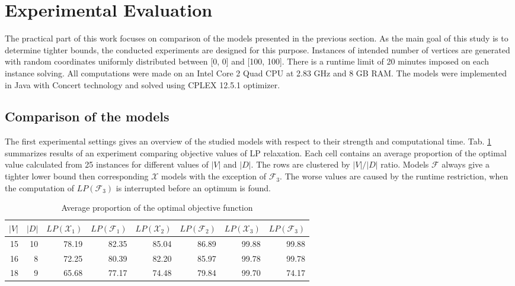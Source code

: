 \section{Experimental Evaluation}
\label{sec:exp}

The practical part of this work focuses on comparison of the models presented in the previous section.
As the main goal of this study is to determine tighter bounds, the conducted experiments are designed for this purpose.
Instances of intended number of vertices are generated with random coordinates uniformly distributed between [0, 0] and [100, 100].
There is a runtime limit of 20 minutes imposed on each instance solving.
All computations were made on an Intel Core 2 Quad CPU at 2.83 GHz and 8 GB RAM.
The models were implemented in Java with Concert technology and solved using CPLEX 12.5.1 optimizer.
 
\subsection{Comparison of the models}

The first experimental settings gives an overview of the studied models with respect to their strength and computational time. 
Tab. \ref{tab:small_inst_cost} summarizes results of an experiment comparing objective values of LP relaxation. 
Each cell contains an average proportion of the optimal value calculated from 25 instances for different values of $|V|$ and $|D|$. 
The rows are clustered by $|V|/|D|$ ratio.
Models $\mathcal{F}$ always give a tighter lower bound then corresponding $\mathcal{X}$ models with the exception of $\mathcal{F}_3$.
The worse values are caused by the runtime restriction, when the computation of $LP(\mathcal{F}_3)$ is interrupted before an optimum is found.
\begin{table}[h!]
\centering
\setlength{\tabcolsep}{6pt} %
\renewcommand{\arraystretch}{1.4} %
\begin{tabular}{rrrrrrrr}
$|V|$ & $|D|$ & $LP(\mathcal{X}_1)$ & $LP(\mathcal{F}_1)$ & $LP(\mathcal{X}_2)$ & $LP(\mathcal{F}_2)$ & $LP(\mathcal{X}_3)$ &$LP(\mathcal{F}_3)$\\\hline
  15 & 10      & 78.19  & 82.35  & 85.04    & 86.89    & 99.88  & 99.88\\
  16 & 8       & 72.25  & 80.39  & 82.20    & 85.97    & 99.78  & 99.78\\
  18 & 9       & 65.68  & 77.17  & 74.48    & 79.84    & 99.70  & 74.17\\ 
\end{tabular}
\caption{Average proportion of the optimal objective function}
\label{tab:small_inst_cost}
\end{table}

